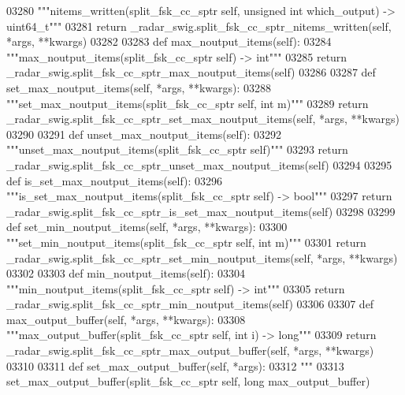 \begin{DoxyCode}
{{{{{{{{{{{{03280         \textcolor{stringliteral}{"""nitems\_written(split\_fsk\_cc\_sptr self, unsigned int which\_output) -> uint64\_t"""}
03281         \textcolor{keywordflow}{return} \_radar\_swig.split\_fsk\_cc\_sptr\_nitems\_written(self, *args, **kwargs)
03282 
03283     \textcolor{keyword}{def }max_noutput_items(self):
03284         \textcolor{stringliteral}{"""max\_noutput\_items(split\_fsk\_cc\_sptr self) -> int"""}
03285         \textcolor{keywordflow}{return} \_radar\_swig.split\_fsk\_cc\_sptr\_max\_noutput\_items(self)
03286 
03287     \textcolor{keyword}{def }set_max_noutput_items(self, *args, **kwargs):
03288         \textcolor{stringliteral}{"""set\_max\_noutput\_items(split\_fsk\_cc\_sptr self, int m)"""}
03289         \textcolor{keywordflow}{return} \_radar\_swig.split\_fsk\_cc\_sptr\_set\_max\_noutput\_items(self, *args, **kwargs)
03290 
03291     \textcolor{keyword}{def }unset_max_noutput_items(self):
03292         \textcolor{stringliteral}{"""unset\_max\_noutput\_items(split\_fsk\_cc\_sptr self)"""}
03293         \textcolor{keywordflow}{return} \_radar\_swig.split\_fsk\_cc\_sptr\_unset\_max\_noutput\_items(self)
03294 
03295     \textcolor{keyword}{def }is_set_max_noutput_items(self):
03296         \textcolor{stringliteral}{"""is\_set\_max\_noutput\_items(split\_fsk\_cc\_sptr self) -> bool"""}
03297         \textcolor{keywordflow}{return} \_radar\_swig.split\_fsk\_cc\_sptr\_is\_set\_max\_noutput\_items(self)
03298 
03299     \textcolor{keyword}{def }set_min_noutput_items(self, *args, **kwargs):
03300         \textcolor{stringliteral}{"""set\_min\_noutput\_items(split\_fsk\_cc\_sptr self, int m)"""}
03301         \textcolor{keywordflow}{return} \_radar\_swig.split\_fsk\_cc\_sptr\_set\_min\_noutput\_items(self, *args, **kwargs)
03302 
03303     \textcolor{keyword}{def }min_noutput_items(self):
03304         \textcolor{stringliteral}{"""min\_noutput\_items(split\_fsk\_cc\_sptr self) -> int"""}
03305         \textcolor{keywordflow}{return} \_radar\_swig.split\_fsk\_cc\_sptr\_min\_noutput\_items(self)
03306 
03307     \textcolor{keyword}{def }max_output_buffer(self, *args, **kwargs):
03308         \textcolor{stringliteral}{"""max\_output\_buffer(split\_fsk\_cc\_sptr self, int i) -> long"""}
03309         \textcolor{keywordflow}{return} \_radar\_swig.split\_fsk\_cc\_sptr\_max\_output\_buffer(self, *args, **kwargs)
03310 
03311     \textcolor{keyword}{def }set_max_output_buffer(self, *args):
03312         \textcolor{stringliteral}{"""}
03313 \textcolor{stringliteral}{        set\_max\_output\_buffer(split\_fsk\_cc\_sptr self, long max\_output\_buffer)}
}}}}}}}}}}}}
\end{DoxyCode}
